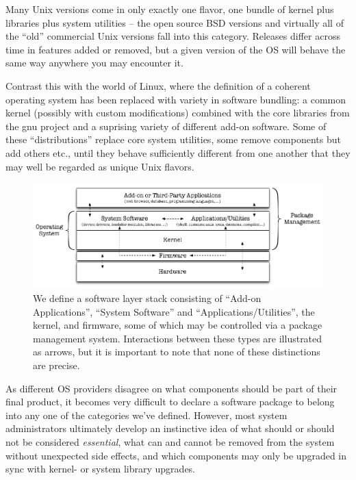 Many Unix versions come in only exactly one flavor,
one bundle of kernel plus libraries plus system
utilities -- the open source BSD versions and
virtually all of the ``old'' commercial Unix versions
fall into this category.  Releases differ across time
in features added or removed, but a given version of
the OS will behave the same way anywhere you may
encounter it.

Contrast this with the world of Linux, where the
definition of a coherent operating system has been
replaced with variety in software bundling: a common
kernel (possibly with custom modifications) combined
with the core libraries from the \gls{gnu} project and
a suprising variety of different add-on software.
Some of these ``distributions'' replace core system
utilities, some remove components but add others etc.,
until they behave sufficiently different from one
another that they may well be regarded as unique Unix
flavors.  \\

\begin{figure}[t]
	\centering
	\includegraphics[width=.85\textwidth]{05/pics/types-of-software}
		\caption[Types of Software]{We define a software layer
			stack consisting of ``Add-on Applications'',
			``System Software'' and
			``Applications/Utilities'', the kernel, and
			firmware, some of which may be controlled via a
			package management system.  Interactions between
			these types are illustrated as arrows, but it is
			important to note that none of these distinctions
			are precise.
			\label{fig:software:types}}
\end{figure}


As different OS providers disagree on what components
should be part of their final product, it becomes very
difficult to declare a software package to belong into
any one of the categories we've defined.  However,
most system administrators ultimately develop an
instinctive idea of what should or should not be
considered {\em essential}, what can and cannot be
removed from the system without unexpected side
effects, and which components may only be upgraded in
sync with kernel- or system library upgrades.

